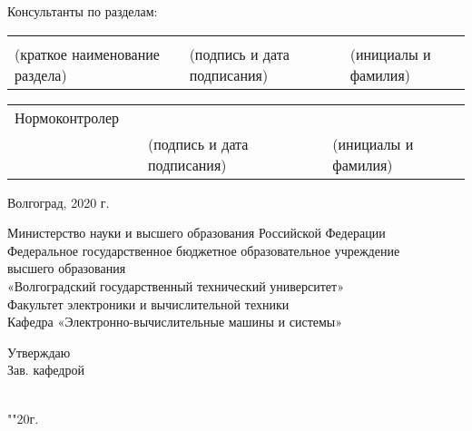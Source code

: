 \begin{nospasing}
\bigskip
\bigskip

\noindent
Консультанты по разделам: \\
\noindent
\begin{tabularx}{\linewidth}{@{}llYlY@{}}
	&&  &&  \\
	\footnotesize(краткое наименование раздела)\normalsize && \footnotesize(подпись и дата подписания)\normalsize && \footnotesize(инициалы и фамилия)\normalsize
\end{tabularx}

\bigskip

\noindent
\begin{tabularx}{\linewidth}{@{}llYlY@{}}
	Нормоконтролер &  &&  \\
	&&\footnotesize(подпись и дата подписания)\normalsize && \footnotesize(инициалы и фамилия)\normalsize \\
\end{tabularx}
\end{nospasing}

\hfill

\begin{center}
	Волгоград, 2020 г.
\end{center}


\newpage

\thispagestyle{empty}

\begin{nospasing}
    \begin{center}
        Министерство науки и высшего образования Российской Федерации \\
        Федеральное государственное бюджетное образовательное учреждение \\
        высшего образования \\
        «Волгоградский государственный технический университет» \\
        Факультет электроники и вычислительной техники \\
        Кафедра «Электронно-вычислительные машины и системы» \\
    \end{center}
\end{nospasing}

\hfill
\begin{minipage}[t]{0.4\linewidth}
    Утверждаю \\
    Зав. кафедрой \\
      \\
    	
	\smallskip
	
	"\underline{\hspace*{.7cm}}"{}\underline{\hspace*{3cm}}20\underline{\hspace*{.7cm}}г.
\end{minipage}

